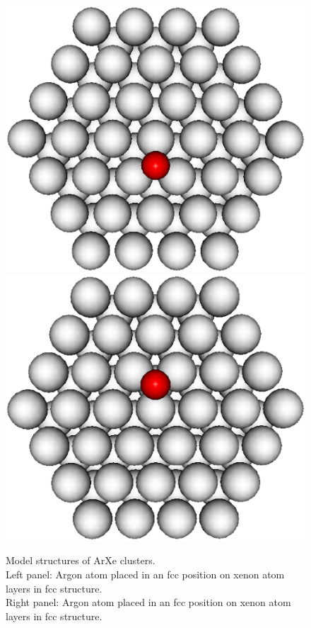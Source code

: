 \begin{figure}[htb]
 \centering
 \includegraphics[scale=0.27]{pics/fcc.eps}
 \includegraphics[scale=0.27]{pics/hcp.eps}
 \caption{Model structures of ArXe clusters.\\
          Left panel: Argon atom placed
          in an \ac{fcc} position on xenon atom layers in \ac{fcc} structure.\\
          Right panel: Argon atom placed
          in an \ac{fcc} position on xenon atom layers in \ac{fcc} structure.}
 \label{figure:model_clusters}
\end{figure}

